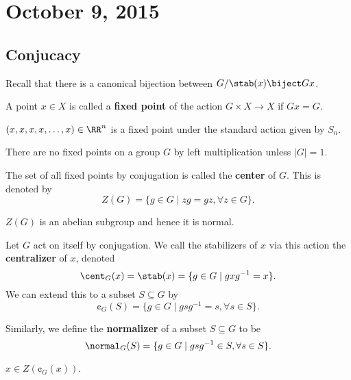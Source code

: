 \section{October 9, 2015}

\subsection{Conjucacy}
Recall that there is a canonical bijection between $G / \stab(x) \biject
Gx$.

\begin{df}
A point $x \in X$ is called a \textbf{fixed point} of the action $G
\times X \to X$ if $Gx = G$.
\end{df}

\begin{ex}
$(x, x, x, x, \dots, x) \in \RR^n$ is a fixed point under the standard
action given by $S_n$.
\end{ex}

\begin{ex}
There are no fixed points on a group $G$ by left multiplication unless
$\lvert G \rvert = 1$.
\end{ex}

\begin{df}
The set of all fixed points by conjugation is called the \textbf{center}
of $G$. This is denoted by
\[ Z(G) = \lbrace g \in G \mid zg = gz, \forall z \in G \rbrace. \]
\end{df}

\begin{rem}
$Z(G)$ is an abelian subgroup and hence it is normal.
\end{rem}

\begin{df}
Let $G$ act on itself by conjugation. We call the stabilizers of $x$ via
this action the \textbf{centralizer} of $x$, denoted
\[ \cent_G(x) = \stab(x) = \lbrace g \in G \mid gxg^{-1} = x \rbrace. \]
We can extend this to a subset $S \subseteq G$ by
\[ \cent_G(S) = \lbrace g \in G \mid gsg^{-1} = s, \forall s \in S
\rbrace. \]
\end{df}

\begin{df}
Similarly, we define the \textbf{normalizer} of a subset $S \subseteq
G$ to be
\[ \normal_G(S) = \lbrace g \in G \mid gsg^{-1} \in S, \forall s \in S
\rbrace. \]
\end{df}

\begin{rem}
$x \in Z(\cent_G(x))$.
\end{rem}

